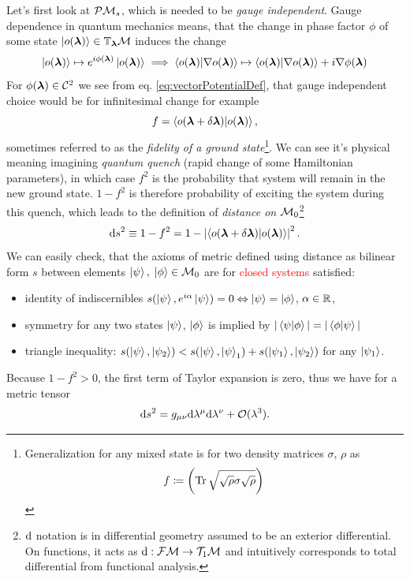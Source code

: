 Let's first look at $\mathcal{P}\mathcal{M}_s$, which is needed to be \emph{gauge independent}. Gauge dependence in quantum mechanics means, that the change in phase factor $\phi$ of some state $\ket{o({\bm\lambda})}\in \mathbb{T}_{\bm\lambda}\mathcal{M}$ induces the change 
\begin{equation}
    \ket{o({\bm\lambda})}\mapsto e^{i\phi({\bm\lambda})} \ket{o({\bm\lambda})} \implies \braket{o({\bm\lambda})|\nabla o({\bm\lambda})}\mapsto \braket{o({\bm\lambda})|\nabla o({\bm\lambda})} + i\nabla \phi({\bm\lambda}) 
\end{equation} 
For $\phi({\bm\lambda})\in \mathcal C^2$ we see from eq. \ref{eq:vectorPotentialDef}, that gauge independent choice would be for infinitesimal change for example
\begin{equation}
    f=\braket{o(\bm{{\bm\lambda}}+\delta\bm{{\bm\lambda}})|o(\bm{{\bm\lambda}})},
\end{equation}
sometimes referred to as the \emph{fidelity of a ground state}\footnote{Generalization for any mixed state is for two density matrices $\sigma$, $\rho$ as $$f\coloneqq \left(\operatorname{\textrm{Tr}} \sqrt{\sqrt{\rho}\sigma\sqrt{\rho}}\right)$$}. We can see it's physical meaning imagining \emph{quantum quench} (rapid change of some Hamiltonian parameters), in which case $f^2$ is the probability that system will remain in the new ground state. $1-f^2$ is therefore probability of exciting the system during this quench, which leads to the definition of \emph{distance on $\mathcal{M}_0$}\footnote{$\mathrm{d}$ notation is in differential geometry assumed to be an exterior differential. On functions, it acts as $\mathrm{d}: \mathcal{F}\mathcal{M}\rightarrow \mathcal{T}_1\mathcal{M}$ and intuitively corresponds to total differential from functional analysis.}
\begin{equation}
    \mathrm{d} s^2 \equiv 1-f^2= 1-\left|\braket{o(\bm{{\bm\lambda}}+\delta\bm{{\bm\lambda}})|o(\bm{{\bm\lambda}})}\right|^2.
    \label{eq:distanceOnM0}
\end{equation}
We can easily check, that the axioms of metric defined using distance as bilinear form $s$ between elements $\ket{\psi},\; \ket{\phi}\in \mathcal{M}_0$ are for \textcolor{red}{closed systems} satisfied:
\begin{itemize}
    \item identity of indiscernibles $s(\ket{\psi},e^{i\alpha}\ket{\psi}) = 0 \Leftrightarrow \ket{\psi}=\ket{\phi}$, $\alpha\in\mathbb{R}$,
    \item symmetry for any two states $\ket{\psi}$, $\ket{\phi}$ is implied by $|\braket{\psi|\phi}|=|\braket{\phi|\psi}|$
    \item triangle inequality: $s(\ket{\psi},\ket{\psi_2}) <s(\ket{\psi},\ket{\psi}_1) + s(\ket{\psi_1},\ket{\psi_2})$ for any $\ket{\psi_1}$.
\end{itemize}
Because $1-f^2>0$, the first term of Taylor expansion is zero, thus we have for a metric tensor
\begin{equation}
    \mathrm{d} s^2 = g_{\mu\nu}\mathrm{d} \lambda^\mu \mathrm{d}\lambda^\nu+\mathcal{O}(\lambda^3).
\end{equation} 

